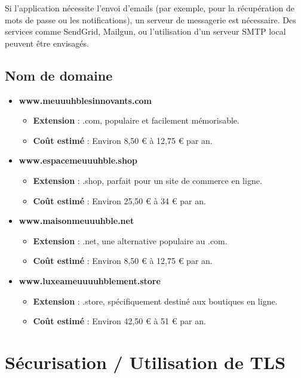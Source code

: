 Si l'application nécessite l'envoi d'emails (par exemple, pour la récupération de mots de passe ou les notifications), un serveur de messagerie est nécessaire. Des services comme SendGrid, Mailgun, ou l'utilisation d'un serveur SMTP local peuvent être envisagés.

\subsection{Nom de domaine}

\begin{itemize}
	\item \textbf{www.meuuuhblesinnovants.com}
	\begin{itemize}
		\item \textbf{Extension} : .com, populaire et facilement mémorisable.
		\item \textbf{Coût estimé} : Environ 8,50 € à 12,75 € par an.
	\end{itemize}
	
	\item \textbf{www.espacemeuuuhble.shop}
	\begin{itemize}
		\item \textbf{Extension} : .shop, parfait pour un site de commerce en ligne.
		\item \textbf{Coût estimé} : Environ 25,50 € à 34 € par an.
	\end{itemize}
	
	\item \textbf{www.maisonmeuuuhble.net}
	\begin{itemize}
		\item \textbf{Extension} : .net, une alternative populaire au .com.
		\item \textbf{Coût estimé} : Environ 8,50 € à 12,75 € par an.
	\end{itemize}
	
	\item \textbf{www.luxeameuuuuhblement.store}
	\begin{itemize}
		\item \textbf{Extension} : .store, spécifiquement destiné aux boutiques en ligne.
		\item \textbf{Coût estimé} : Environ 42,50 € à 51 € par an.
	\end{itemize}
\end{itemize}

\section{Sécurisation / Utilisation de TLS}

